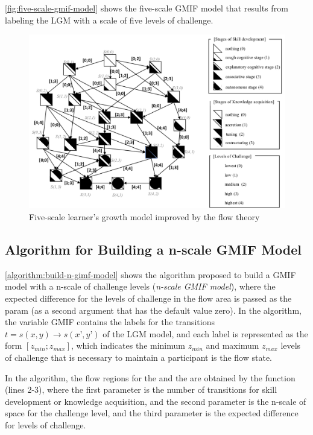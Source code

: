 \autoref{fig:five-scale-gmif-model} shows the five-scale GMIF model that results from labeling the LGM with a scale of five levels of challenge. 

 \begin{figure}[htb]
 \caption{Five-scale learner's growth model improved by the flow theory}
 \label{fig:five-scale-gmif-model}
 \centering
 \includegraphics[width=1\textwidth]{images/chap-model-gmif/five-scale-gmif-model.png}
 \fautor
\end{figure}

\newpage
\subsection{Algorithm for Building a n-scale GMIF Model}
\label{subsec:pseudo-algorithm-n-scale-gmifs}

\autoref{algorithm:build-n-gimf-model} shows the algorithm proposed to build a GMIF model with a n-scale of challenge levels (\emph{n-scale GMIF model}), where the expected difference for the levels of challenge in the flow area is passed as the param  (as a second argument that has the default value zero). In the algorithm, the variable GMIF contains the labels for the transitions $t = s(x,y) \to s(x’,y’)$ of the LGM model, and each label is represented as the form $[z_{min}; z_{max}]$, which indicates the minimum $z_{min}$ and maximum $z_{max}$ levels of challenge that is necessary to maintain a participant is the flow state.

In the algorithm, the flow regions for the  and the  are obtained by the function  (lines 2-3), where the first parameter is the number of transitions for skill development or knowledge acquisition, and the second parameter is the n-scale of space for the challenge level, and the third parameter is the expected difference for levels of challenge.

